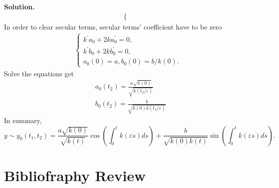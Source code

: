 \documentclass[a4paper]{book}
\newenvironment{solution}%
{\noindent\textbf{Solution.}}%
{\qedhere}
\numberwithin{equation}{chapter}
\theoremstyle{definition}
\begin{document}
\begin{solution}
\begin{align*}
\begin{cases}
    \end{cases}
  \end{align*}
  In order to clear secular terms, secular terms' coefficient have to be zero
  \begin{align*}
    \begin{cases}
      k^\prime a_0 + 2 k a_0^\prime  = 0, \\
      k^\prime b_0 + 2 k b_0^\prime = 0, \\
      a_0(0) = a, b_0(0) = b/k(0).
    \end{cases}
  \end{align*}
  Solve the equations get
  \begin{align*}
    &a_0(t_2) = \frac{a  \sqrt{k(0)}}{\sqrt{k(t_2/\varepsilon)}} \\
    &b_0(t_2) = \frac{b}{\sqrt{k(0)k(t_2/\varepsilon)}} 
  \end{align*}
  In summary,
  \[y \sim y_0(t_1,t_2) = \frac{a  \sqrt{k(0)}}{\sqrt{k(t)}} \cos(\int_0^t k(\varepsilon s)ds) + \frac{b}{\sqrt{k(0)k(t)}} \sin(\int_0^t k(\varepsilon s)ds).\]
\end{solution}

\section{Bibliofraphy Review}\label{sec:2}




%   

%   

%   


\end{document}
